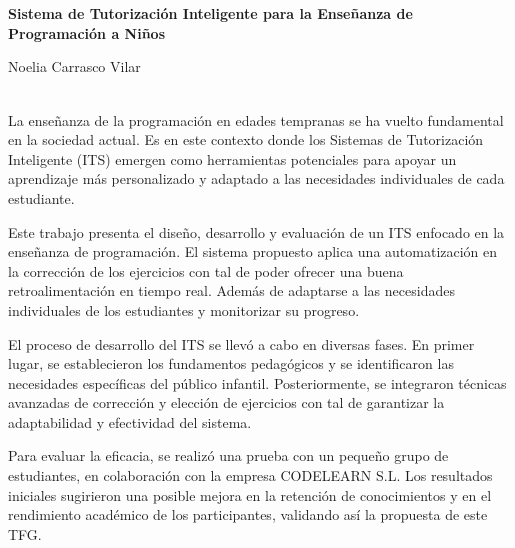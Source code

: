 \chapter*{}
\thispagestyle{empty}
\begin{center}

\large\bfseries Sistema de Tutorización Inteligente para la Enseñanza de Programación a Niños\\[1cm]

\end{center}

\begin{center}

Noelia Carrasco Vilar \\

\end{center}

\vspace{0.5cm}
\vspace{0.5cm}

\\

La enseñanza de la programación en edades tempranas se ha vuelto fundamental en la sociedad actual. Es en este contexto donde los Sistemas de Tutorización Inteligente (ITS) emergen como herramientas potenciales para apoyar un aprendizaje más personalizado y adaptado a las necesidades individuales de cada estudiante.

Este trabajo presenta el diseño, desarrollo y evaluación de un ITS enfocado en la enseñanza de programación. El sistema propuesto aplica una automatización en la corrección de los ejercicios con tal de poder ofrecer una buena retroalimentación en tiempo real. Además de adaptarse a las necesidades individuales de los estudiantes y monitorizar su progreso. 

El proceso de desarrollo del ITS se llevó a cabo en diversas fases. En primer lugar, se establecieron los fundamentos pedagógicos y se identificaron las necesidades específicas del público infantil. Posteriormente, se integraron técnicas avanzadas de corrección y elección de ejercicios con tal de garantizar la adaptabilidad y efectividad del sistema.

Para evaluar la eficacia, se realizó una prueba con un pequeño grupo de estudiantes, en colaboración con la empresa CODELEARN S.L. Los resultados iniciales sugirieron una posible mejora en la retención de conocimientos y en el rendimiento académico de los participantes, validando así la propuesta de este TFG.

